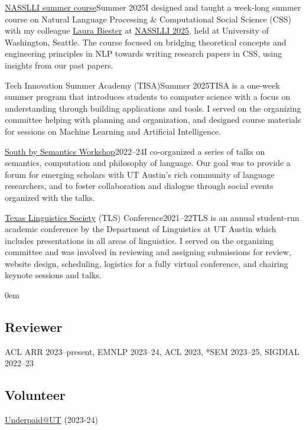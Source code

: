 \smallentry
  {\large \href{https://nasslli25-nlp-css.github.io}{NASSLLI summer course}}{\large Summer 2025}{I designed and taught a week-long summer course on Natural Language Processing \& Computational Social Science (CSS) with my colleague \href{https://www.laurabiester.com}{Laura Biester} at \href{https://nasslli25.shane.st}{NASSLLI 2025}, held at University of Washington, Seattle. The course focused on bridging theoretical concepts and engineering principles in NLP towards writing research papers in CSS, using insights from our past papers.}

\smallentry
  {\large Tech Innovation Summer Academy (TISA)}{\large Summer 2025}{TISA is a one-week summer program that introduces students to computer science with a focus on understanding through building applications and tools. I served on the organizing committee helping with planning and organization, and designed course materials for sessions on Machine Learning and Artificial Intelligence.}

\smallentry
  {\large \href{https://sites.google.com/utexas.edu/sxsw/archive}{South by Semantics Workshop}}{\large 2022--24}{I co-organized a series of talks on semantics, computation and philosophy of language. Our goal was to provide a forum for emerging scholars with UT Austin's rich community of language researchers, and to foster collaboration and dialogue through social events organized with the talks.}
  
\smallentry
    {\large \href{http://tls.ling.utexas.edu/}{Texas Linguistics Society} (TLS) Conference}{\large 2021--22}{TLS is an annual student-run academic conference by the Department of Linguistics at UT Austin which includes presentations in all areas of linguistics. I served on the organizing committee and was involved in reviewing and assigning submissions for review, website design, scheduling, logistics for a fully virtual conference, and chairing keynote sessions and talks.}

\leftskip0em\relax

\subsection{Reviewer}

\quad ACL ARR 2023--present, EMNLP 2023--24, ACL 2023, *SEM 2023--25, SIGDIAL 2022--23

\subsection{Volunteer}

\quad \href{http://underpaidatut.org}{Underpaid\makeatletter @\makeatother UT} (2023-24)

